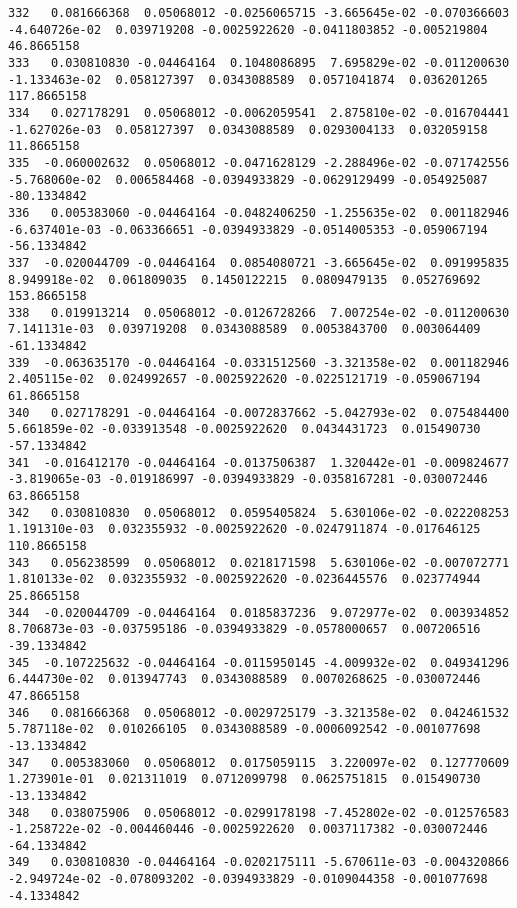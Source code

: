 \documentclass[15pt,a4paper,openright]{article}
\begin{document}
\begin{lstlisting}[language=AMPL, caption = data file]
332   0.081666368  0.05068012 -0.0256065715 -3.665645e-02 -0.070366603 -4.640726e-02  0.039719208 -0.0025922620 -0.0411803852 -0.005219804   46.8665158
333   0.030810830 -0.04464164  0.1048086895  7.695829e-02 -0.011200630 -1.133463e-02  0.058127397  0.0343088589  0.0571041874  0.036201265  117.8665158
334   0.027178291  0.05068012 -0.0062059541  2.875810e-02 -0.016704441 -1.627026e-03  0.058127397  0.0343088589  0.0293004133  0.032059158   11.8665158
335  -0.060002632  0.05068012 -0.0471628129 -2.288496e-02 -0.071742556 -5.768060e-02  0.006584468 -0.0394933829 -0.0629129499 -0.054925087  -80.1334842
336   0.005383060 -0.04464164 -0.0482406250 -1.255635e-02  0.001182946 -6.637401e-03 -0.063366651 -0.0394933829 -0.0514005353 -0.059067194  -56.1334842
337  -0.020044709 -0.04464164  0.0854080721 -3.665645e-02  0.091995835  8.949918e-02  0.061809035  0.1450122215  0.0809479135  0.052769692  153.8665158
338   0.019913214  0.05068012 -0.0126728266  7.007254e-02 -0.011200630  7.141131e-03  0.039719208  0.0343088589  0.0053843700  0.003064409  -61.1334842
339  -0.063635170 -0.04464164 -0.0331512560 -3.321358e-02  0.001182946  2.405115e-02  0.024992657 -0.0025922620 -0.0225121719 -0.059067194   61.8665158
340   0.027178291 -0.04464164 -0.0072837662 -5.042793e-02  0.075484400  5.661859e-02 -0.033913548 -0.0025922620  0.0434431723  0.015490730  -57.1334842
341  -0.016412170 -0.04464164 -0.0137506387  1.320442e-01 -0.009824677 -3.819065e-03 -0.019186997 -0.0394933829 -0.0358167281 -0.030072446   63.8665158
342   0.030810830  0.05068012  0.0595405824  5.630106e-02 -0.022208253  1.191310e-03  0.032355932 -0.0025922620 -0.0247911874 -0.017646125  110.8665158
343   0.056238599  0.05068012  0.0218171598  5.630106e-02 -0.007072771  1.810133e-02  0.032355932 -0.0025922620 -0.0236445576  0.023774944   25.8665158
344  -0.020044709 -0.04464164  0.0185837236  9.072977e-02  0.003934852  8.706873e-03 -0.037595186 -0.0394933829 -0.0578000657  0.007206516  -39.1334842
345  -0.107225632 -0.04464164 -0.0115950145 -4.009932e-02  0.049341296  6.444730e-02  0.013947743  0.0343088589  0.0070268625 -0.030072446   47.8665158
346   0.081666368  0.05068012 -0.0029725179 -3.321358e-02  0.042461532  5.787118e-02  0.010266105  0.0343088589 -0.0006092542 -0.001077698  -13.1334842
347   0.005383060  0.05068012  0.0175059115  3.220097e-02  0.127770609  1.273901e-01  0.021311019  0.0712099798  0.0625751815  0.015490730  -13.1334842
348   0.038075906  0.05068012 -0.0299178198 -7.452802e-02 -0.012576583 -1.258722e-02 -0.004460446 -0.0025922620  0.0037117382 -0.030072446  -64.1334842
349   0.030810830 -0.04464164 -0.0202175111 -5.670611e-03 -0.004320866 -2.949724e-02 -0.078093202 -0.0394933829 -0.0109044358 -0.001077698   -4.1334842

\end{lstlisting}
\end{document}
